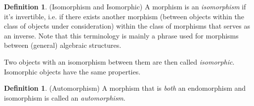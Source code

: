 \documentclass[12pt]{book}
\numberwithin{equation}{section} %
\theoremstyle{plain}
\theoremstyle{definition}
\newtheorem{defn}[thm]{Definition}
\theoremstyle{remark}
\begin{document}
\begin{defn}(Isomorphism and Isomorphic)
A morphism is an \emph{isomorphism} if it's invertible, i.e. if there
exists another morphism
(between objects within the class of objects under consideration)
within the class of morphisms that serves as an inverse.
Note that this terminology is mainly a phrase used for morphisms between
(general) algebraic structures.

Two objects with an isomorphism between them are then called
\emph{isomorphic}.
Isomorphic objects have the same properties.
\end{defn}


\begin{defn}(Automorphism)
A morphism that is \emph{both} an endomorphism and isomorphism is called
an \emph{automorphism}.
\end{defn}
\end{document}
